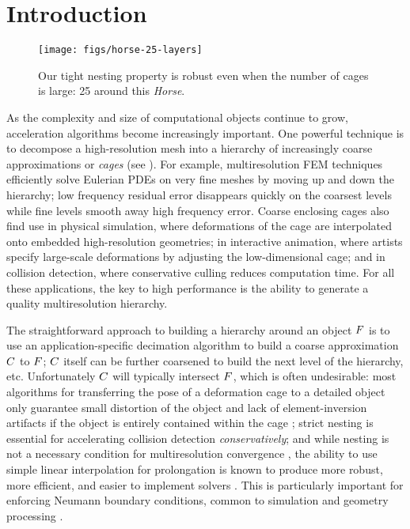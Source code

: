 \section{Introduction}
\label{sec:introduction}

\begin{figure}[b]
  \texttt{[image: figs/horse-25-layers]}
  \caption{Our tight nesting property is robust even when the number of cages
  is large: 25 around this \emph{Horse}. }
  \label{fig:horse-25-layers}
\end{figure}

As the complexity and size of computational objects continue to grow,
acceleration algorithms become increasingly important. One powerful technique
is to decompose a high-resolution mesh into a hierarchy of increasingly coarse
approximations or \emph{cages} (see ). For example,
multiresolution FEM techniques efficiently solve Eulerian PDEs on very fine
meshes by moving up and down the hierarchy; low frequency residual error
disappears quickly on the coarsest levels while fine levels smooth away high
frequency error. Coarse enclosing cages also find use in physical simulation,
where deformations of the cage are interpolated onto embedded high-resolution
geometries; in interactive animation, where artists specify large-scale
deformations by adjusting the low-dimensional cage; and in collision detection,
where conservative culling reduces computation time. For all these
applications, the key to high performance is the ability to generate a quality
multiresolution hierarchy.

The straightforward approach to building a hierarchy around an object $F$ is
to use an application-specific decimation algorithm to build a coarse
approximation $C$ to $F$; $C$ itself can be further coarsened to build the
next level of the hierarchy, etc. Unfortunately $C$ will typically intersect
$F$, which is often undesirable: most algorithms for transferring the pose of
a deformation cage to a detailed object only guarantee small distortion of the
object and lack of element-inversion artifacts if the object is entirely
contained within the cage \cite{HarmonicCoodinates07,Ben-Chen:2009:VHM}; strict
nesting is essential for accelerating collision detection
\emph{conservatively}; and while nesting is not a necessary condition for
multiresolution convergence \cite{Chan96overlappingschwarz}, the ability to use
simple linear interpolation for prolongation is known to produce more robust,
more efficient, and easier to implement solvers
\cite{chan2000robust,dickopf2010multilevel}. This is particularly important for
enforcing Neumann boundary conditions, common to simulation and geometry
processing \cite{chan1999boundary}.

